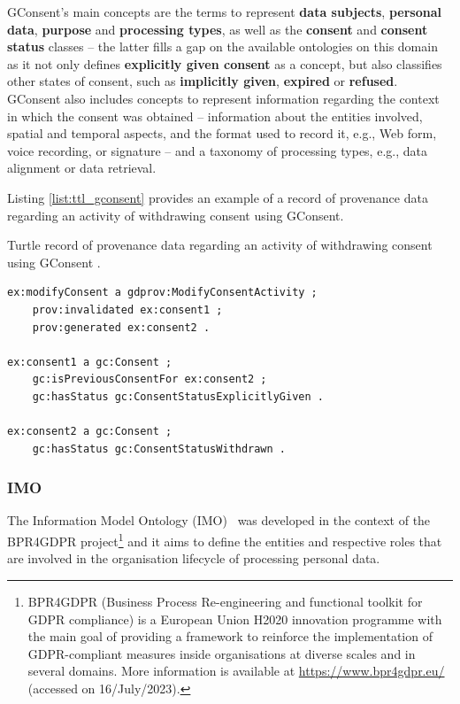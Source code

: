 GConsent's main concepts are the terms to represent \textbf{data subjects}, \textbf{personal data}, \textbf{purpose} and \textbf{processing types}, as well as the \textbf{consent} and \textbf{consent status} classes -- the latter fills a gap on the available ontologies on this domain as it not only defines \textbf{explicitly given consent} as a concept, but also classifies other states of consent, such as \textbf{implicitly given}, \textbf{expired} or \textbf{refused}.
GConsent also includes concepts to represent information regarding the context in which the consent was obtained -- information about the entities involved, spatial and temporal aspects, and the format used to record it, e.g., Web form, voice recording, or signature -- and a taxonomy of processing types, e.g., data alignment or data retrieval.

Listing \ref{list:ttl_gconsent} provides an example of a record of provenance data regarding an activity of withdrawing consent using GConsent.

\begin{listing}[ht]
\caption{Turtle record of provenance data regarding an activity of withdrawing consent using GConsent \citep{hitzler_gconsent_2019}.}
\label{list:ttl_gconsent}
\begin{verbatim}
ex:modifyConsent a gdprov:ModifyConsentActivity ;
    prov:invalidated ex:consent1 ;
    prov:generated ex:consent2 .

ex:consent1 a gc:Consent ;
    gc:isPreviousConsentFor ex:consent2 ;
    gc:hasStatus gc:ConsentStatusExplicitlyGiven .

ex:consent2 a gc:Consent ;
    gc:hasStatus gc:ConsentStatusWithdrawn .
\end{verbatim}
\end{listing}

\subsubsection{IMO}
\label{sec:imo}

The Information Model Ontology (IMO)~\citep{papagiannakopoulou_leveraging_2014,lioudakis_compliance_2019} was developed in the context of the BPR4GDPR project\footnote{BPR4GDPR (Business Process Re-engineering and functional toolkit for GDPR compliance) is a European Union H2020 innovation programme with the main goal of providing a framework to reinforce the implementation of GDPR-compliant measures inside organisations at diverse scales and in several domains. More information is available at \url{https://www.bpr4gdpr.eu/} (accessed on 16/July/2023).} and it aims to define the entities and respective roles that are involved in the organisation lifecycle of processing personal data.

